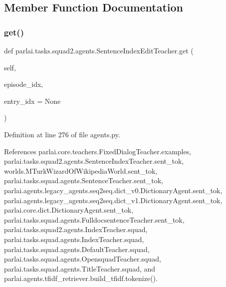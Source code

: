 \subsection{Member Function Documentation}
\mbox{\label{classparlai_1_1tasks_1_1squad2_1_1agents_1_1SentenceIndexEditTeacher_afb925573397b65655e1375f2f501b545}} 
\subsubsection{\texorpdfstring{get()}{get()}}
{\footnotesize\ttfamily def parlai.\+tasks.\+squad2.\+agents.\+Sentence\+Index\+Edit\+Teacher.\+get (\begin{DoxyParamCaption}\item[{}]{self,  }\item[{}]{episode\+\_\+idx,  }\item[{}]{entry\+\_\+idx = {\ttfamily None} }\end{DoxyParamCaption})}



Definition at line 276 of file agents.\+py.



References parlai.\+core.\+teachers.\+Fixed\+Dialog\+Teacher.\+examples, parlai.\+tasks.\+squad2.\+agents.\+Sentence\+Index\+Teacher.\+sent\+\_\+tok, worlds.\+M\+Turk\+Wizard\+Of\+Wikipedia\+World.\+sent\+\_\+tok, parlai.\+tasks.\+squad.\+agents.\+Sentence\+Teacher.\+sent\+\_\+tok, parlai.\+agents.\+legacy\+\_\+agents.\+seq2seq.\+dict\+\_\+v0.\+Dictionary\+Agent.\+sent\+\_\+tok, parlai.\+agents.\+legacy\+\_\+agents.\+seq2seq.\+dict\+\_\+v1.\+Dictionary\+Agent.\+sent\+\_\+tok, parlai.\+core.\+dict.\+Dictionary\+Agent.\+sent\+\_\+tok, parlai.\+tasks.\+squad.\+agents.\+Fulldocsentence\+Teacher.\+sent\+\_\+tok, parlai.\+tasks.\+squad2.\+agents.\+Index\+Teacher.\+squad, parlai.\+tasks.\+squad.\+agents.\+Index\+Teacher.\+squad, parlai.\+tasks.\+squad.\+agents.\+Default\+Teacher.\+squad, parlai.\+tasks.\+squad.\+agents.\+Opensquad\+Teacher.\+squad, parlai.\+tasks.\+squad.\+agents.\+Title\+Teacher.\+squad, and parlai.\+agents.\+tfidf\+\_\+retriever.\+build\+\_\+tfidf.\+tokenize().




